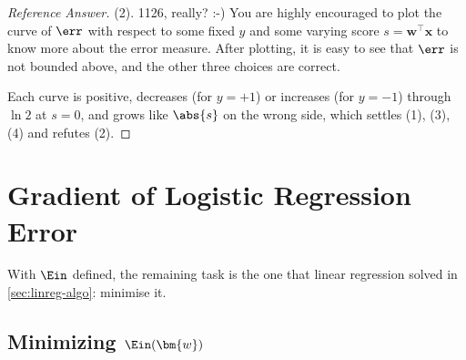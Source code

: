 \begin{proof}[Reference Answer]
    (2). 1126, really? :-) You are highly encouraged to plot the curve of
    \(\err\) with respect to some fixed \(y\) and some varying score \(s =
    \bm{w}^\top \bm{x}\) to know more about the error measure. After plotting,
    it is easy to see that \(\err\) is not bounded above, and the other three
    choices are correct.
    \begin{center}
    \end{center}
    Each curve is positive, decreases (for \(y = +1\)) or increases (for \(y =
    -1\)) through \(\ln 2\) at \(s = 0\), and grows like \(\abs{s}\) on the
    wrong side, which settles (1), (3), (4) and refutes (2).
\end{proof}

\section{Gradient of Logistic Regression Error}\label{sec:logreg-grad}


With \(\Ein\) defined, the remaining task is the one that linear regression
solved in \autoref{sec:linreg-algo}: minimise it.

\subsection{Minimizing \texorpdfstring{\(\Ein(\bm{w})\)}{Ein(w)}}

